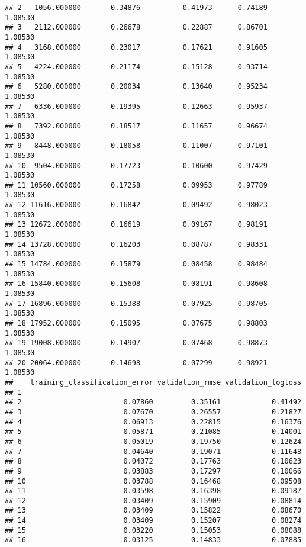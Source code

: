 \documentclass[]{article}
\begin{document}
\begin{verbatim}
## 2   1056.000000       0.34876          0.41973      0.74189       1.08530
## 3   2112.000000       0.26678          0.22887      0.86701       1.08530
## 4   3168.000000       0.23017          0.17621      0.91605       1.08530
## 5   4224.000000       0.21174          0.15128      0.93714       1.08530
## 6   5280.000000       0.20034          0.13640      0.95234       1.08530
## 7   6336.000000       0.19395          0.12663      0.95937       1.08530
## 8   7392.000000       0.18517          0.11657      0.96674       1.08530
## 9   8448.000000       0.18058          0.11007      0.97101       1.08530
## 10  9504.000000       0.17723          0.10600      0.97429       1.08530
## 11 10560.000000       0.17258          0.09953      0.97789       1.08530
## 12 11616.000000       0.16842          0.09492      0.98023       1.08530
## 13 12672.000000       0.16619          0.09167      0.98191       1.08530
## 14 13728.000000       0.16203          0.08787      0.98331       1.08530
## 15 14784.000000       0.15879          0.08458      0.98484       1.08530
## 16 15840.000000       0.15608          0.08191      0.98608       1.08530
## 17 16896.000000       0.15388          0.07925      0.98705       1.08530
## 18 17952.000000       0.15095          0.07675      0.98803       1.08530
## 19 19008.000000       0.14907          0.07468      0.98873       1.08530
## 20 20064.000000       0.14698          0.07299      0.98921       1.08530
##    training_classification_error validation_rmse validation_logloss
## 1                                                                  
## 2                        0.07860         0.35161            0.41492
## 3                        0.07670         0.26557            0.21827
## 4                        0.06913         0.22815            0.16376
## 5                        0.05871         0.21085            0.14001
## 6                        0.05019         0.19750            0.12624
## 7                        0.04640         0.19071            0.11648
## 8                        0.04072         0.17763            0.10623
## 9                        0.03883         0.17297            0.10066
## 10                       0.03788         0.16468            0.09508
## 11                       0.03598         0.16398            0.09187
## 12                       0.03409         0.15909            0.08814
## 13                       0.03409         0.15822            0.08670
## 14                       0.03409         0.15207            0.08274
## 15                       0.03220         0.15053            0.08088
## 16                       0.03125         0.14833            0.07885

\end{verbatim}
\end{document}
